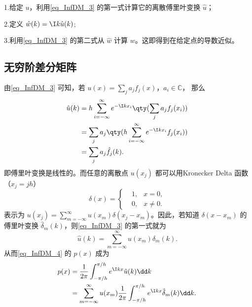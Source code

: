 1.给定 $u$，利用\autoref{eq_InfDM_3} 的第一式计算它的离散傅里叶变换 $\hat u$；

2.定义 $\hat w(k)=\I k\hat u(k)$;

3.利用\autoref{eq_InfDM_3} 的第二式从 $\hat w$ 计算 $w$。这即得到在给定点的导数近似。

\subsection{无穷阶差分矩阵}
由\autoref{eq_InfDM_3}  可知，若 $u(x)=\sum\limits_{j}a_jf_j(x)$，$a_i\in\mathbb C$， 那么
\begin{equation}
\begin{aligned}
\hat u(k)&=h\sum_{i=-\infty}^{\infty}e^{-\I kx_i}\qty(\sum\limits_{j}a_jf_j(x_i))\\
&=\sum\limits_{j}a_j\qty(h\sum_{i=-\infty}^{\infty}e^{-\I kx_i}f_j(x_i))\\
&=\sum_{j}a_j\hat f_j(k).
\end{aligned}~
\end{equation}
即傅里叶变换是线性的。而任意的离散点 $u(x_j)$ 都可以用Kronecker Delta 函数（$x_j=jh$） 
\begin{equation}
\delta(x)=\left\{\begin{aligned}
&1,&x=0,\\
&0,&x\neq0.
\end{aligned}\right.~
\end{equation}
表示为 $u(x_j)=\sum\limits_{m=-\infty}^{\infty}u(x_m)\delta(x_j-x_m)$。因此，若知道 $\delta(x-x_m)$ 的傅里叶变换 $\hat\delta_m(k)$，则\autoref{eq_InfDM_3} 的第一式就为 
\begin{equation}
\hat u(k)=\sum\limits_{m=-\infty}^\infty u(x_m)\hat\delta_m(k).~
\end{equation}
从而\autoref{eq_InfDM_4} 的 $p(x)$ 成为
\begin{equation}
\begin{aligned}
p(x)&=\frac{1}{2\pi}\int_{-\pi/h}^{\pi/h} e^{\I kx}\hat u(k)\dd k\\
&=\sum\limits_{m=-\infty}^\infty u(x_m)\frac{1}{2\pi}\int_{-\pi/h}^{\pi/h} e^{\I kx}\hat\delta_m(k)\dd k.
\end{aligned}~
\end{equation}

